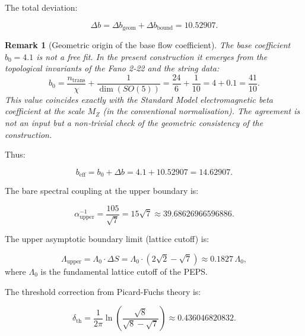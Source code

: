 \documentclass[12pt]{article}
\numberwithin{equation}{section}
\newtheorem{remark}[theorem]{Remark}
\begin{document}
The total deviation:

\begin{equation}\label{eq:deltab_total}
\Delta b = \Delta b_{\text{geom}} + \Delta b_{\text{bound}} = 10.52907.
\end{equation}

\begin{remark}[Geometric origin of the base flow coefficient]
The base coefficient \(b_0 = 4.1\) is not a free fit. In the present construction it emerges from the topological invariants of the Fano 2-22 and the string data:
\[
b_0 = \frac{n_{\text{trans}}}{\chi} + \frac{1}{\dim(SO(5))} = \frac{24}{6} + \frac{1}{10} = 4 + 0.1 = \frac{41}{10}.
\]
This value coincides exactly with the Standard Model electromagnetic beta coefficient at the scale \(M_Z\) (in the conventional normalisation). The agreement is not an input but a non‑trivial check of the geometric consistency of the construction.
\end{remark}

Thus:

\begin{equation}\label{eq:beff}
b_{\text{eff}} = b_0 + \Delta b = 4.1 + 10.52907 = 14.62907.
\end{equation}

The bare spectral coupling at the upper boundary is:

\begin{equation}\label{eq:alpha_upper}
\alpha_{\text{upper}}^{-1} = \frac{105}{\sqrt{7}} = 15\sqrt{7} \approx 39.68626966596886.
\end{equation}

The upper asymptotic boundary limit (lattice cutoff) is:

\begin{equation}\label{eq:Lambda_upper}
\Lambda_{\text{upper}} = \Lambda_0 \cdot \Delta S = \Lambda_0 \cdot (2\sqrt{2} - \sqrt{7}) \approx 0.1827\,\Lambda_0,
\end{equation}
where \(\Lambda_0\) is the fundamental lattice cutoff of the PEPS.

The threshold correction from Picard-Fuchs theory is:

\begin{equation}\label{eq:delta_th}
\delta_{\text{th}} = \frac{1}{2\pi}\ln\left(\frac{\sqrt{8}}{\sqrt{8} - \sqrt{7}}\right) \approx 0.436046820832.
\end{equation}
\end{document}
